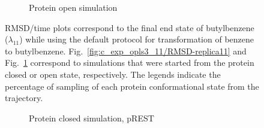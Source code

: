\begin{figure}[!ht]
\begin{subfigure}{\textwidth}
   \caption{Protein open simulation}
   \label{fig:o_exp_opls3_24/RMSD-replica11}
\end{subfigure}%
\caption{RMSD/time plots correspond to the final end state of butylbenzene ($\lambda_{11}$) while using the default protocol for transformation of benzene to butylbenzene. 
Fig.~\ref{fig:c_exp_opls3_11/RMSD-replica11} and Fig.~\ref{fig:o_exp_opls3_24/RMSD-replica11} 
correspond to simulations that were started from the protein closed or open state, respectively. 
The legends indicate the percentage of sampling of each protein conformational state from the trajectory.
}
\label{fig:benzene_to_n-butyl}
\end{figure}

\begin{figure}[!ht]
\begin{subfigure}{\textwidth}
   \centering
    \caption{Protein closed simulation, pREST}
   \label{fig:c_opls3_rest1_1/RMSD-replica11}
\end{subfigure}
\centering
\begin{subfigure}{\textwidth}
  \centering

\end{subfigure}
\end{figure}
